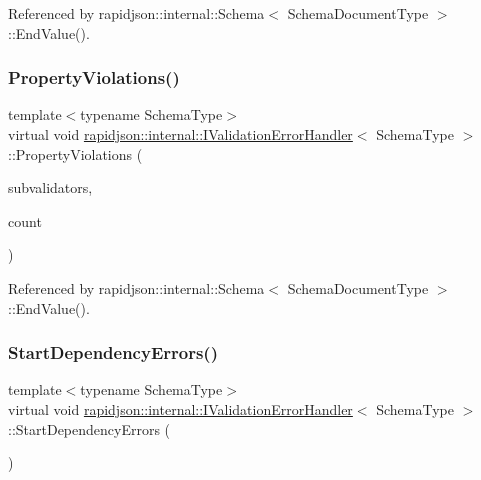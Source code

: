 Referenced by rapidjson\+::internal\+::\+Schema$<$ Schema\+Document\+Type $>$\+::\+End\+Value().

\mbox{\label{classrapidjson_1_1internal_1_1_i_validation_error_handler_af2e15dd86413c5f6553bb8eccfee7f95}} 
\subsubsection{\texorpdfstring{PropertyViolations()}{PropertyViolations()}}
{\footnotesize\ttfamily template$<$typename Schema\+Type$>$ \\
virtual void \mbox{\hyperlink{classrapidjson_1_1internal_1_1_i_validation_error_handler}{rapidjson\+::internal\+::\+I\+Validation\+Error\+Handler}}$<$ Schema\+Type $>$\+::Property\+Violations (\begin{DoxyParamCaption}\item[{\mbox{\hyperlink{classrapidjson_1_1internal_1_1_i_schema_validator}{I\+Schema\+Validator}} $\ast$$\ast$}]{subvalidators,  }\item[{\mbox{\hyperlink{namespacerapidjson_a44eb33eaa523e36d466b1ced64b85c84}{Size\+Type}}}]{count }\end{DoxyParamCaption})\hspace{0.3cm}{\ttfamily [pure virtual]}}



Referenced by rapidjson\+::internal\+::\+Schema$<$ Schema\+Document\+Type $>$\+::\+End\+Value().

\mbox{\label{classrapidjson_1_1internal_1_1_i_validation_error_handler_a953298d04037e20024b69f9032a91e62}} 
\subsubsection{\texorpdfstring{StartDependencyErrors()}{StartDependencyErrors()}}
{\footnotesize\ttfamily template$<$typename Schema\+Type$>$ \\
virtual void \mbox{\hyperlink{classrapidjson_1_1internal_1_1_i_validation_error_handler}{rapidjson\+::internal\+::\+I\+Validation\+Error\+Handler}}$<$ Schema\+Type $>$\+::Start\+Dependency\+Errors (\begin{DoxyParamCaption}{ }\end{DoxyParamCaption})\hspace{0.3cm}{\ttfamily [pure virtual]}}



